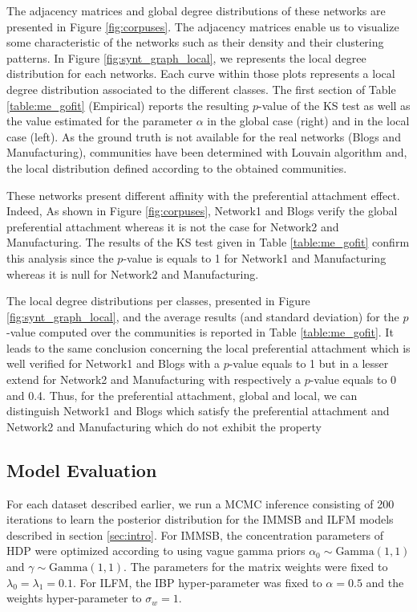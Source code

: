 The adjacency matrices and global degree distributions of these networks are presented in Figure \ref{fig:corpuses}. The adjacency matrices enable us to visualize some characteristic of the networks such as their density and their clustering patterns. In Figure \ref{fig:synt_graph_local}, we represents the local degree distribution for each networks. Each curve within those plots represents a local degree distribution associated to the different classes. The first section of Table \ref{table:me_gofit} (Empirical) reports the resulting $p$-value of the KS test as well as the value estimated for the parameter  $\alpha$ in the global case (right) and in the local case (left). As the ground truth is not available for the real networks (Blogs and Manufacturing), communities have been determined with Louvain algorithm \cite{Blondel2008} and, the local distribution defined according to the obtained communities. 

These networks present  different affinity with the preferential attachment effect.
Indeed, As shown in Figure \ref{fig:corpuses}, Network1 and Blogs verify the  global preferential attachment whereas it is not the case for Network2 and Manufacturing. The results of the KS test given in Table \ref{table:me_gofit} confirm this analysis since the $p$-value is equals to 1 for Network1 and Manufacturing whereas it is null for Network2 and Manufacturing.

The local degree distributions per classes, presented in Figure \ref{fig:synt_graph_local}, and the average results (and standard deviation) for the $p$-value computed over the communities is reported in Table \ref{table:me_gofit}. It leads to the same conclusion concerning the local preferential attachment which is well verified for Network1 and Blogs with a $p$-value equals to 1 but in a lesser extend for Network2 and Manufacturing with respectively a $p$-value equals to 0 and 0.4. Thus, for the preferential attachment, global and local, we can distinguish Network1 and Blogs which satisfy the preferential attachment and Network2 and Manufacturing which do not exhibit the property






\subsection{Model Evaluation}
For each dataset described earlier, we run a MCMC inference consisting of 200 iterations to learn the posterior distribution for the IMMSB and ILFM  models described in section \ref{sec:intro}. For IMMSB, the concentration parameters of HDP were optimized according to \cite{HDP} using vague gamma priors $\alpha_0 \sim \text{Gamma}(1,1)$ and $\gamma \sim \text{Gamma}(1,1)$. The parameters for the matrix weights were fixed to $\lambda_0=\lambda_1=0.1$. For ILFM, the IBP hyper-parameter was fixed to $\alpha=0.5$ and the weights hyper-parameter to $\sigma_w = 1$. 

